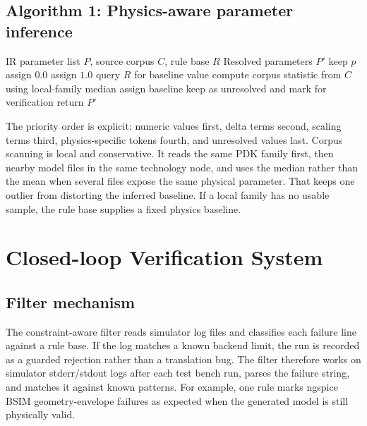 \documentclass[conference]{IEEEtran}
\begin{document}
\subsection{Algorithm 1: Physics-aware parameter inference}
\begin{algorithm}[!t]
\caption{Physics-Aware Parameter Inference}
\label{alg:inference}
\begin{algorithmic}[1]
\REQUIRE IR parameter list $P$, source corpus $C$, rule base $R$
\ENSURE Resolved parameters $P'$
        \STATE keep $p$
        \STATE assign $0.0$
        \STATE assign $1.0$
        \STATE query $R$ for baseline value
            \STATE compute corpus statistic from $C$ using local-family median
        \ENDIF
        \STATE assign baseline
    \ELSE
        \STATE keep as unresolved and mark for verification
    \ENDIF
\ENDFOR
\STATE return $P'$
\end{algorithmic}
\end{algorithm}

The priority order is explicit: numeric values first, delta terms second, scaling terms third, physics-specific tokens fourth, and unresolved values last. Corpus scanning is local and conservative. It reads the same PDK family first, then nearby model files in the same technology node, and uses the median rather than the mean when several files expose the same physical parameter. That keeps one outlier from distorting the inferred baseline. If a local family has no usable sample, the rule base supplies a fixed physics baseline.

\vspace{-0.6cm}

\section{Closed-loop Verification System}
\label{sec:verification}
\vspace{-0.6cm}
\subsection{Filter mechanism}
The constraint-aware filter reads simulator log files and classifies each failure line against a rule base. If the log matches a known backend limit, the run is recorded as a guarded rejection rather than a translation bug. The filter therefore works on simulator stderr/stdout logs after each test bench run, parses the failure string, and matches it against known patterns. For example, one rule marks ngspice BSIM geometry-envelope failures as expected when the generated model is still physically valid.
\end{document}
